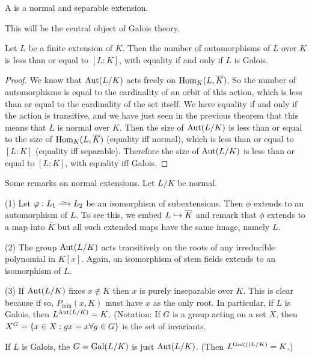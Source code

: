\begin{dfn}
\begin{dfn}
\begin{dfn}
A  is a normal and separable extension.
\end{dfn}

This will be the central object of Galois theory.

\begin{thm}
Let $L$ be a finite extension of $K$. Then the number of automorphisms of $L$ over $K$ is less than or equal to $[L : K]$, with equality if and only if $L$ is Galois.
\end{thm}
\begin{proof}
We know that $\mathrm{Aut}(L/K)$ acts freely on $\mathrm{Hom}_{K}({L, \overline{K}})$.
So the number of automorphisms is equal to the cardinality of an orbit of this action, which is less than or equal to the cardinality of the set itself.
We have equality if and only if the action is transitive, and we have just seen in the previous theorem that this means that $L$ is normal over $K$.
Then the size of $\mathrm{Aut}(L/K)$ is less than or equal to the size of $\mathrm{Hom}_{K}({L, \overline{K}})$ (equality iff normal), which is less than or equal to $[L : K]$ (equality iff separable).
Therefore the size of $\mathrm{Aut}(L/K)$ is less than or equal to $[L : K]$, with equality iff Galois.
\end{proof}

\begin{rmk} 
Some remarks on normal extensions. 
Let $L / K$ be normal.

(1) Let $\phi: L_1 \isomap L_2$ be an isomorphism of subextensions.
Then $\phi$ extends to an automorphism of $L$.
To see this, we embed $L \hookrightarrow \overline{K}$ and remark that $\phi$ extends to a map into $\overline{K}$ but all such extended maps have the same image, namely $L$.

(2) The group $\mathrm{Aut}(L/K)$ acts transitively on the roots of any irreducible polynomial in $K[x]$.
Again, an isomorphism of stem fields extends to an isomorphism of $L$.

(3) If $\mathrm{Aut}(L/K)$ fixes $x \not\in K$ then $x$ is purely inseparable over $K$.
This is clear because if so, $P_\min(x, K)$ must have $x$ as the only root.
In particular, if $L$ is Galois, then $L^{\mathrm{Aut}(L/K)} = K$.
(Notation: If $G$ is a group acting on a set $X$, then $X^G = \left\{x \in X : gx = x \forall g \in G\right\}$ is the set of invariants.
\end{rmk}

\begin{dfn}
If $L$ is Galois, the  $G = \mathrm{Gal}(L/K)$ is just $\mathrm{Aut}(L/K)$.
(Then $L^{\mathrm{Gal}(()L/K)} = K$.)
\end{dfn}


\end{dfn}
\end{dfn}
